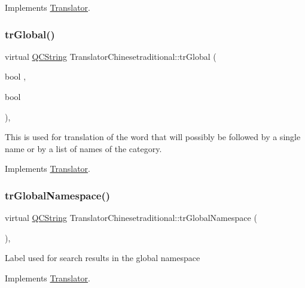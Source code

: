 Implements \mbox{\hyperlink{class_translator}{Translator}}.

\mbox{\label{class_translator_chinesetraditional_ac86e1154739fb45ae06fc17522c0d898}} 
\subsubsection{\texorpdfstring{trGlobal()}{trGlobal()}}
{\footnotesize\ttfamily virtual \mbox{\hyperlink{class_q_c_string}{Q\+C\+String}} Translator\+Chinesetraditional\+::tr\+Global (\begin{DoxyParamCaption}\item[{bool}]{,  }\item[{bool}]{ }\end{DoxyParamCaption})\hspace{0.3cm}{\ttfamily [inline]}, {\ttfamily [virtual]}}

This is used for translation of the word that will possibly be followed by a single name or by a list of names of the category. 

Implements \mbox{\hyperlink{class_translator}{Translator}}.

\mbox{\label{class_translator_chinesetraditional_a1057c630dd7d991d9bffc0781b5edc7d}} 
\subsubsection{\texorpdfstring{trGlobalNamespace()}{trGlobalNamespace()}}
{\footnotesize\ttfamily virtual \mbox{\hyperlink{class_q_c_string}{Q\+C\+String}} Translator\+Chinesetraditional\+::tr\+Global\+Namespace (\begin{DoxyParamCaption}{ }\end{DoxyParamCaption})\hspace{0.3cm}{\ttfamily [inline]}, {\ttfamily [virtual]}}

Label used for search results in the global namespace 

Implements \mbox{\hyperlink{class_translator}{Translator}}.

